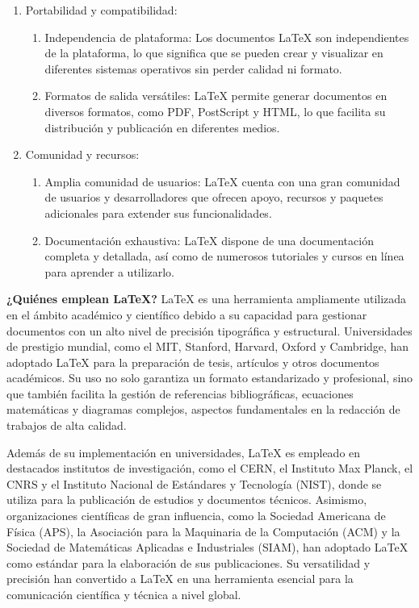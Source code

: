 \documentclass[10pt,twocolumn]{article}
\begin{document}
\begin{enumerate}
\begin{enumerate}
    \end{enumerate}
	\item Portabilidad y compatibilidad:
	\begin{enumerate}
        \item Independencia de plataforma: Los documentos LaTeX son independientes de la plataforma, lo que significa que se pueden crear y visualizar en diferentes sistemas operativos sin perder calidad ni formato.
        \item Formatos de salida versátiles: LaTeX permite generar documentos en diversos formatos, como PDF, PostScript y HTML, lo que facilita su distribución y publicación en diferentes medios.   
    \end{enumerate}
    \item Comunidad y recursos:
    \begin{enumerate}
        \item Amplia comunidad de usuarios: LaTeX cuenta con una gran comunidad de usuarios y desarrolladores que ofrecen apoyo, recursos y paquetes adicionales para extender sus funcionalidades.
        \item Documentación exhaustiva: LaTeX dispone de una documentación completa y detallada, así como de numerosos tutoriales y cursos en línea para aprender a utilizarlo.  
    \end{enumerate}
\end{enumerate} 
 
{\raggedleft \textbf{¿Quiénes emplean LaTeX?}}
LaTeX es una herramienta ampliamente utilizada en el ámbito académico y científico debido a su capacidad para gestionar documentos con un alto nivel de precisión tipográfica y estructural. 
Universidades de prestigio mundial, como el MIT, Stanford, Harvard, Oxford y Cambridge, han adoptado LaTeX para la preparación de tesis, artículos y otros documentos académicos. 
Su uso no solo garantiza un formato estandarizado y profesional, sino que también facilita la gestión de referencias bibliográficas, ecuaciones matemáticas y diagramas complejos, aspectos fundamentales en la redacción de trabajos de alta calidad.

Además de su implementación en universidades, LaTeX es empleado en destacados institutos de investigación, como el CERN, el Instituto Max Planck, el CNRS y el Instituto Nacional de Estándares y Tecnología (NIST), donde se utiliza para la publicación de estudios y documentos técnicos. 
Asimismo, organizaciones científicas de gran influencia, como la Sociedad Americana de Física (APS), la Asociación para la Maquinaria de la Computación (ACM) y la Sociedad de Matemáticas Aplicadas e Industriales (SIAM), han adoptado LaTeX como estándar para la elaboración de sus publicaciones. 
Su versatilidad y precisión han convertido a LaTeX en una herramienta esencial para la comunicación científica y técnica a nivel global.
\end{document}
